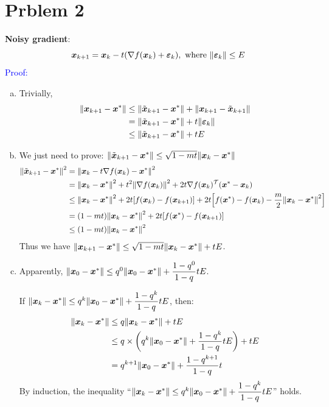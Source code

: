 \documentclass{article}
\def\bx{\boldsymbol{x}}
\def\Eproof{\textcolor{blue}{Proof: }}
\begin{document}
\newpage
\section*{Prblem 2}

\textbf{Noisy gradient}: 
$$
\bx_{k+1} =
\bx_k - t(\nabla f(\bx_k) + \boldsymbol{\varepsilon}_k),
\mbox{ where }
\norm{\boldsymbol{\varepsilon}_k}\le E
$$
\Eproof
\begin{enumerate}[(a)]
	\item 
		Trivially,
		$$
		\begin{aligned}
			\norm{\bx_{k+1} - \bx^*} 
			&\le 
			\norm{\tilde{\bx}_{k+1} - \bx^*}
			+
			\norm{\bx_{k+1} - \tilde{\bx}_{k+1}}
			\\
			&=
			\norm{\tilde{\bx}_{k+1} - \bx^*}
			+
			t\norm{\boldsymbol{\varepsilon}_k}
			\\
			&\le
			\norm{\tilde{\bx}_{k+1} - \bx^*}
			+
			tE
		\end{aligned}
		$$
	
	\item
		We just need to prove: 
		$
		\norm{\tilde{\bx}_{k+1} - \bx^*}
		\le
		\sqrt{1-mt}\norm{\bx_k - \bx^*}
		$
		$$
		\begin{aligned}
			\norm{\tilde{\bx}_{k+1} - \bx^*}^2
			&=
			\norm{\bx_k - t\nabla f(\bx_k) - \bx^*}^2
			\\
			&=
			\norm{\bx_k-\bx^*}^2 + t^2\norm{\nabla f(\bx_k)}^2 
			+ 2t\nabla f(\bx_k)^{\mathcal{T}}(\bx^* - \bx_k)
			\\
			&\le
			\norm{\bx_k-\bx^*}^2 
			+ 2t\qty[f(\bx_k)-f(\bx_{k+1})]
			+ 2t\qty[f(\bx^*)-f(\bx_k)-\frac{m}{2}\norm{\bx_k-\bx^*}^2]
			\\
			&=
			(1-mt)\norm{\bx_k-\bx^*}^2+2t\qty[f(\bx^*)-f(\bx_{k+1})]
			\\
			&\le
			(1-mt)\norm{\bx_k-\bx^*}^2
		\end{aligned}
		$$
		Thus we have 
		$
		\norm{\bx_{k+1}-\bx^*}\le \sqrt{1-mt}\norm{\bx_k-\bx^*}+tE
		$.
	\item
		Apparently, 
		$\norm{\bx_0-\bx^*}\le q^0\norm{\bx_0-\bx^*}+\dfrac{1-q^0}{1-q}tE$.

		If 
		$\norm{\bx_k-\bx^*}\le q^k\norm{\bx_0-\bx^*}+\dfrac{1-q^k}{1-q}tE$, then:
		$$
		\begin{aligned}
			\norm{\bx_k-\bx^*}
			&\le
			q\norm{\bx_k-\bx^*}+tE
			\\
			&\le
			q\times
			\qty(q^k\norm{\bx_0-\bx^*}+\dfrac{1-q^k}{1-q}tE)
			+tE
			\\
			&=
			q^{k+1}\norm{\bx_0-\bx^*}+\dfrac{1-q^{k+1}}{1-q}t
		\end{aligned}
		$$
		By induction, the inequality ``$\norm{\bx_k-\bx^*}\le q^k\norm{\bx_0-\bx^*}+\dfrac{1-q^k}{1-q}tE$'' holds.


\end{enumerate}
\end{document}
